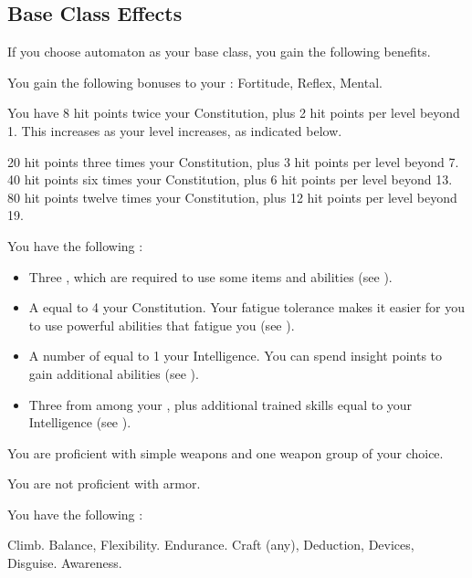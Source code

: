 \subsection{Base Class Effects}
If you choose automaton as your base class, you gain the following benefits.

You gain the following bonuses to your :  Fortitude,  Reflex,  Mental.

You have 8 hit points \add twice your Constitution, plus 2 hit points per level beyond 1.
This increases as your level increases, as indicated below.
\begin{itemize}
	 20 hit points \add three times your Constitution, plus 3 hit points per level beyond 7.
	 40 hit points \add six times your Constitution, plus 6 hit points per level beyond 13.
	 80 hit points \add twelve times your Constitution, plus 12 hit points per level beyond 19.
\end{itemize}

 You have the following :
\begin{itemize}
	\item Three , which are required to use some items and abilities (see ).
	\item A  equal to 4 \add your Constitution.
	      Your fatigue tolerance makes it easier for you to use powerful abilities that fatigue you (see ).
	\item A number of  equal to 1 \add your Intelligence.
	      You can spend insight points to gain additional abilities (see ).
	\item Three  from among your , plus additional trained skills equal to your Intelligence (see ).
\end{itemize}

You are proficient with simple weapons and one weapon group of your choice.

You are not proficient with armor.

You have the following :
\begin{itemize}
	 Climb.
	 Balance, Flexibility.
	 Endurance.
	 Craft (any), Deduction, Devices, Disguise.
	 Awareness.
\end{itemize}

